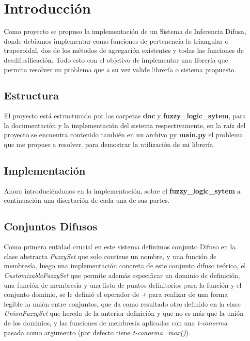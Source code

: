 \documentclass[a4paper,10pt,twocolumn]{article}
\begin{document}
\section{Introducción}
  Como proyecto se propuso la implementaci\'on de un Sistema de Inferencia Difusa, donde deb\'iamos implementar como funciones de pertenencia la triangular o trapezoidal, dos de los m\'etodos de agregaci\'on existentes y todas las funciones de desdifusificaci\'on. Todo esto con el objetivo de implementar una librer\'ia que permita resolver un problema que a su vez valide librer\'ia o sistema propuesto.


\subsection{Estructura}

 El proyecto est\'a estructurado por las carpetas \textbf{doc} y \textbf{fuzzy\_logic\_sytem}, para la documentaci\'on y la implementaci\'on del sistema respectivamente, en la ra\'iz del proyecto se encuentra contenido tambi\'en en un archivo py \textbf{main.py} el problema que me propuse a resolver, para demostrar la utilizaci\'on de mi librer\'ia.
 
\subsection{Implementaci\'on}
Ahora introduci\'endonos en la implementaci\'on, sobre el \textbf{fuzzy\_logic\_sytem} a continuaci\'on una disertaci\'on de cada una de sus partes. 

\subsection*{Conjuntos Difusos}

 Como primera entidad crucial en este sistema definimos conjunto Difuso en la clase abstracta \textit{FuzzySet} que solo contiene un nombre, y una funci\'on de membres\'ia, luego una implementaci\'on concreta de este conjunto difuso te\'orico, el \textit{CustomizableFuzzySet} que permite adem\'as especificar un dominio de definici\'on, una funci\'on de membres\'ia y una lista de puntos definitorios para la funci\'on y el conjunto dominio, se le defini\'o el operador de \textit{+} para realizar de una forma legible la uni\'on entre conjuntos, que da como resultado otro definido en la clase \textit{UnionFuzzySet} que hereda de la anterior definici\'on y que no es m\'as que la uni\'on de los dominios, y las funciones de membres\'ia aplicadas con una \textit{t-conorma} pasada como argumento (por defecto tiene \textit{t-conorma}=\textit{max()}).
 
\end{document}
